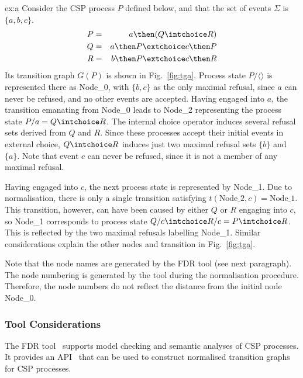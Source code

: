 \begin{example}{ex:a}
Consider the CSP process $P$ defined below, and that the set of events
$\Sigma$ is $\{a,b,c\}$.
\begin{eqnarray*}
P & = & a \then (Q\intchoice R)
\\
Q & = & a \then P \extchoice c \then P
\\
R & = & b \then P \extchoice c \then R
\end{eqnarray*}
Its transition graph $G(P)$ is shown in Fig.~\ref{fig:tga}. Process state
$P/\langle\rangle$ is represented there as Node\_0, with $\{ b,c\}$ as the
only maximal refusal, since $a$ can never be refused, and no other events are
accepted. Having engaged into $a$, the transition emanating from Node\_0
leads to Node\_2 representing  the process state $P/a = Q\intchoice R$. The
internal choice operator induces several refusal sets derived from $Q$ and
$R$. Since these processes accept their initial events in external choice,
$Q\intchoice R$ induces just two maximal refusal sets $\{b\}$ and
$\{a\}$. Note that event $c$ can never be refused, since it is not a member
of any maximal refusal.

Having engaged into $c$, the next process state is represented by Node\_1.
Due to normalisation, there is only a single transition satisfying
$t(\text{Node\_2},c) = \text{Node\_1}$. This transition, however, can have
been caused by either $Q$ or $R$ engaging into $c$, so Node\_1 corresponds to
process state $Q/c \intchoice R/c = P \intchoice R$. This is reflected by the
two maximal refusals labelling Node\_1. Similar considerations explain the other nodes and transition in
Fig.~\ref{fig:tga}.

Note that the node names are generated by the FDR tool (see next paragraph). The node numbering is generated by the tool during the normalisation procedure. Therefore,
the node numbers do not reflect the distance from the initial node Node\_0.
\end{example}


\subsubsection*{Tool Considerations}
The FDR tool~\cite{fdr} supports model checking and semantic analyses of CSP
processes. It provides an API~\cite{fdrmanual} that can be used to construct
normalised transition graphs for CSP processes.

